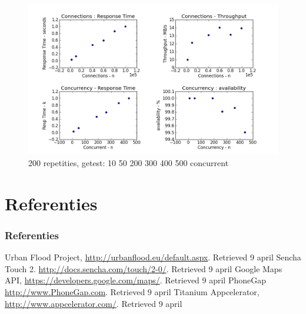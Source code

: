 \documentclass[10pt,a4paper]{beamer}
\begin{document}
\begin{frame}
\begin{figure}
\includegraphics[scale=0.4]{siege_200r.png}
\caption{200 repetities, getest: 10 50 200 300 400 500 concurrent}
\end{figure}
\end{frame}

\section{Referenties}
\begin{frame}
\begin{thebibliography}{9}
\frametitle{Referenties}
  Urban Flood Project,
  \url{http://urbanflood.eu/default.aspx}.
  Retrieved 9 april
	Sencha Touch 2.
	\url{http://docs.sencha.com/touch/2-0/}.
	Retrieved 9 april
	Google Maps API,
	\url{https://developers.google.com/maps/}.
	Retrieved 9 april
	PhoneGap
	\url{http://www.PhoneGap.com}.
	Retrieved 9 april
	Titanium Appcelerator,
	\url{http://www.appcelerator.com/}.
	Retrieved 9 april
\end{thebibliography}
\end{frame}
\begin{frame}


\end{frame}
\end{document}

